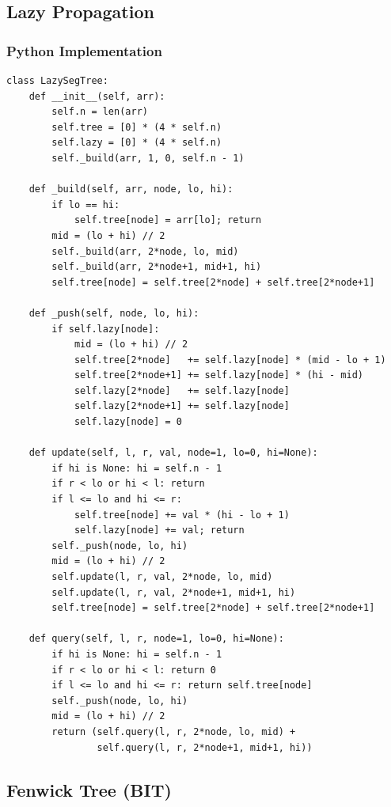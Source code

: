 \documentclass[10pt,a4paper]{article}
\theoremstyle{cpstyle}
\begin{document}
\subsection{Lazy Propagation}

\subsubsection{Python Implementation}
\begin{lstlisting}[caption={Segment Tree with Lazy Propagation -- range add, range sum}]
class LazySegTree:
    def __init__(self, arr):
        self.n = len(arr)
        self.tree = [0] * (4 * self.n)
        self.lazy = [0] * (4 * self.n)
        self._build(arr, 1, 0, self.n - 1)

    def _build(self, arr, node, lo, hi):
        if lo == hi:
            self.tree[node] = arr[lo]; return
        mid = (lo + hi) // 2
        self._build(arr, 2*node, lo, mid)
        self._build(arr, 2*node+1, mid+1, hi)
        self.tree[node] = self.tree[2*node] + self.tree[2*node+1]

    def _push(self, node, lo, hi):
        if self.lazy[node]:
            mid = (lo + hi) // 2
            self.tree[2*node]   += self.lazy[node] * (mid - lo + 1)
            self.tree[2*node+1] += self.lazy[node] * (hi - mid)
            self.lazy[2*node]   += self.lazy[node]
            self.lazy[2*node+1] += self.lazy[node]
            self.lazy[node] = 0

    def update(self, l, r, val, node=1, lo=0, hi=None):
        if hi is None: hi = self.n - 1
        if r < lo or hi < l: return
        if l <= lo and hi <= r:
            self.tree[node] += val * (hi - lo + 1)
            self.lazy[node] += val; return
        self._push(node, lo, hi)
        mid = (lo + hi) // 2
        self.update(l, r, val, 2*node, lo, mid)
        self.update(l, r, val, 2*node+1, mid+1, hi)
        self.tree[node] = self.tree[2*node] + self.tree[2*node+1]

    def query(self, l, r, node=1, lo=0, hi=None):
        if hi is None: hi = self.n - 1
        if r < lo or hi < l: return 0
        if l <= lo and hi <= r: return self.tree[node]
        self._push(node, lo, hi)
        mid = (lo + hi) // 2
        return (self.query(l, r, 2*node, lo, mid) +
                self.query(l, r, 2*node+1, mid+1, hi))
\end{lstlisting}

\subsection{Fenwick Tree (BIT)}
\end{document}
